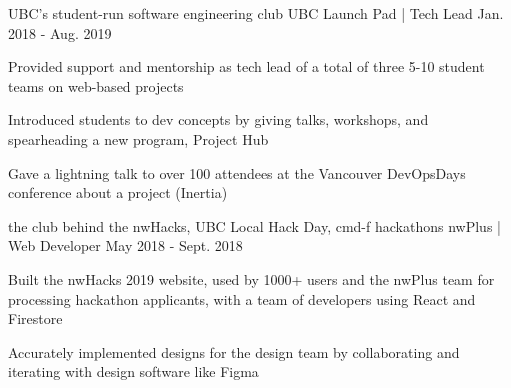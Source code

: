 \begin{cventries}

  \cventry
    {UBC's student-run software engineering club} %
    {UBC Launch Pad | Tech Lead} %
    {} %
    {Jan. 2018 - Aug. 2019} %
    {
      \begin{cvitems} %
        \item {Provided support and mentorship as tech lead of a total of three 5-10 student teams on web-based projects}
        \item {Introduced students to dev concepts by giving talks, workshops, and spearheading a new program, Project Hub}
        \item {Gave a lightning talk to over 100 attendees at the Vancouver DevOpsDays conference about a project (Inertia)}
      \end{cvitems}
    }

  \cventry
    {the club behind the nwHacks, UBC Local Hack Day, cmd-f hackathons} %
    {nwPlus | Web Developer} %
    {} %
    {May 2018 - Sept. 2018} %
    {
      \begin{cvitems} %
        \item {Built the nwHacks 2019 website, used by 1000+ users and the nwPlus team for processing hackathon applicants, with a team of developers using React and Firestore}
        \item {Accurately implemented designs for the design team by collaborating and iterating with design software like Figma}
      \end{cvitems}
    }

\end{cventries}
